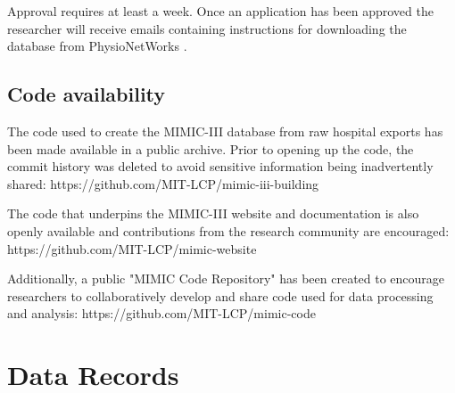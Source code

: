 \documentclass[english]{article}
\begin{document}
Approval requires at least a week. Once an application has been approved the researcher will receive emails containing instructions for downloading the database from PhysioNetWorks \cite{cite5}. 

\subsection*{Code availability}


The code used to create the MIMIC-III database from raw hospital exports has been made available in a public archive. Prior to opening up the code, the commit history was deleted to avoid sensitive information being inadvertently shared: https://github.com/MIT-LCP/mimic-iii-building 

The code that underpins the MIMIC-III website and documentation is also openly available and contributions from the research community are encouraged: \\ https://github.com/MIT-LCP/mimic-website 

Additionally, a public "MIMIC Code Repository" has been created to encourage researchers to collaboratively develop and share code used for data processing and analysis: https://github.com/MIT-LCP/mimic-code


\section*{Data Records}

\end{document}
